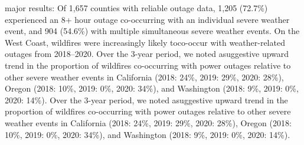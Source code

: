     \item major results: Of 1,657 counties with reliable outage data, 1,205 (72.7\%) experienced an 8+ hour outage co-occurring with an individual severe weather event, and 904 (54.6\%) with multiple simultaneous severe weather events. On the West Coast, wildfires were increasingly likely toco-occur with weather-related outages from 2018–2020. Over the 3-year period, we noted asuggestive upward trend in the proportion of wildfires co-occurring with power outages relative to other severe weather events in California (2018: 24\%, 2019: 29\%, 2020: 28\%), Oregon (2018: 10\%, 2019: 0\%, 2020: 34\%), and Washington (2018: 9\%, 2019: 0\%, 2020: 14\%). Over the 3-year period, we noted asuggestive upward trend in the proportion of wildfires co-occurring with power outages relative to other severe weather events in California (2018: 24\%, 2019: 29\%, 2020: 28\%), Oregon (2018: 10\%, 2019: 0\%, 2020: 34\%), and Washington (2018: 9\%, 2019: 0\%, 2020: 14\%).

